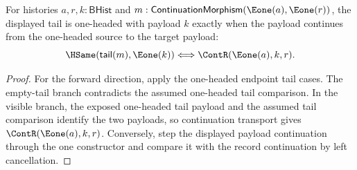 \begin{theorem}
\label{thm:continuation-morphism-e1-source-e1-target-tail-e1-iff}
For histories $a,r,k:\mathsf{BHist}$ and
$m:\mathsf{ContinuationMorphism}(\Eone(a),\Eone(r))$, the displayed tail is
one-headed with payload $k$ exactly when the payload continues from the
one-headed source to the target payload:
$$
\HSame(\mathsf{tail}(m),\Eone(k))
\Longleftrightarrow
\ContR(\Eone(a),k,r).
$$
\end{theorem}
\begin{proof}
For the forward direction, apply the one-headed endpoint tail cases. The
empty-tail branch contradicts the assumed one-headed tail comparison. In the
visible branch, the exposed one-headed tail payload and the assumed tail
comparison identify the two payloads, so continuation transport gives
$\ContR(\Eone(a),k,r)$. Conversely, step the displayed payload continuation
through the one constructor and compare it with the record continuation by
left cancellation.
\end{proof}


